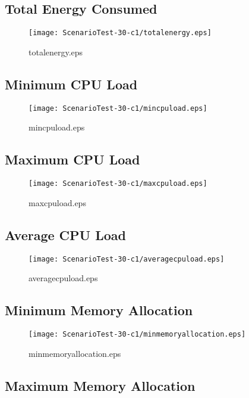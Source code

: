 \documentclass{elsart}
\begin{document}
\clearpage
\subsection{Total Energy Consumed}

\begin{figure}[ht]
\centering
\texttt{[image: ScenarioTest-30-c1/totalenergy.eps]}
\caption{totalenergy.eps}\label{fig:totalenergy}
\end{figure}

\clearpage
\subsection{Minimum CPU Load}

\begin{figure}[ht]
\centering
\texttt{[image: ScenarioTest-30-c1/mincpuload.eps]}
\caption{mincpuload.eps}\label{fig:mincpuload}
\end{figure}

\clearpage
\subsection{Maximum CPU Load}

\begin{figure}[ht]
\centering
\texttt{[image: ScenarioTest-30-c1/maxcpuload.eps]}
\caption{maxcpuload.eps}\label{fig:maxcpuload}
\end{figure}

\clearpage
\subsection{Average CPU Load}

\begin{figure}[ht]
\centering
\texttt{[image: ScenarioTest-30-c1/averagecpuload.eps]}
\caption{averagecpuload.eps}\label{fig:averagecpuload}
\end{figure}

\clearpage
\subsection{Minimum Memory Allocation}

\begin{figure}[ht]
\centering
\texttt{[image: ScenarioTest-30-c1/minmemoryallocation.eps]}
\caption{minmemoryallocation.eps}\label{fig:minmemoryallocation}
\end{figure}

\clearpage
\subsection{Maximum Memory Allocation}
\end{document}
